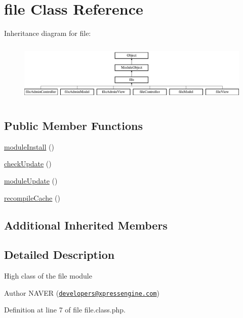 \hypertarget{classfile}{\section{file Class Reference}
\label{classfile}
}
Inheritance diagram for file\+:\begin{figure}[H]
\begin{center}
\leavevmode
\includegraphics[height=2.916667cm]{classfile}
\end{center}
\end{figure}
\subsection*{Public Member Functions}
\begin{DoxyCompactItemize}
\item 
\hyperlink{classfile_a5e8c34a5d2187f2a332a88e112c90bdc}{module\+Install} ()
\item 
\hyperlink{classfile_ad9420bb93d958cdd9741a27137f9cf2a}{check\+Update} ()
\item 
\hyperlink{classfile_a13a5d2858426d421327f744555fec4fb}{module\+Update} ()
\item 
\hyperlink{classfile_abdd4624fd45f101cdf4009eeda3cc1ab}{recompile\+Cache} ()
\end{DoxyCompactItemize}
\subsection*{Additional Inherited Members}


\subsection{Detailed Description}
High class of the file module \begin{DoxyAuthor}{Author}
N\+A\+V\+E\+R (\href{mailto:developers@xpressengine.com}{\tt developers@xpressengine.\+com}) 
\end{DoxyAuthor}


Definition at line 7 of file file.\+class.\+php.



